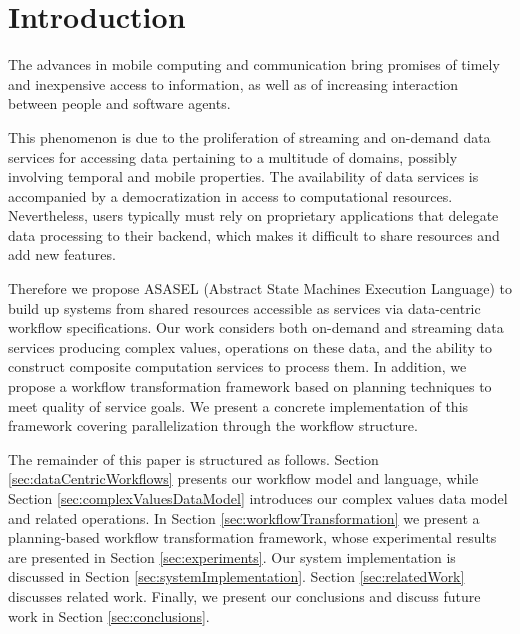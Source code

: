 	
\section{Introduction}\label{sec:asasel:intro}

The advances in mobile computing and communication bring promises of timely and inexpensive access to information, as well as of increasing interaction between people and software agents. 

This phenomenon is due to the proliferation of streaming and on-demand data services for accessing data pertaining to a multitude of domains,  possibly involving temporal and mobile properties. The availability of data services is accompanied by a democratization in access to computational resources. Nevertheless, users typically must rely on proprietary applications that delegate data processing to their backend, which makes it difficult to share resources and add new features.	
	
Therefore we propose ASASEL (Abstract State Machines Execution Language) to build up systems from shared resources accessible as services via data-centric workflow specifications. Our work considers both on-demand and streaming data services producing complex values, operations on these data, and the ability to construct composite computation services to process them. In addition, we propose a workflow transformation framework 
based on planning techniques to meet quality of service goals. We present a concrete implementation of this framework covering parallelization through the workflow structure.

The remainder of this paper is structured as follows. Section \ref{sec:dataCentricWorkflows} presents our workflow model and language, while Section \ref{sec:complexValuesDataModel} introduces our complex values data model and related operations. In Section \ref{sec:workflowTransformation} we present a planning-based workflow transformation framework, whose experimental results are presented in Section \ref{sec:experiments}. Our system implementation is discussed in Section \ref{sec:systemImplementation}. Section \ref{sec:relatedWork} discusses related work. Finally, we present our conclusions and discuss future work in Section \ref{sec:conclusions}.

 

